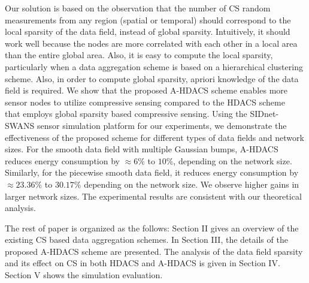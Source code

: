 \documentclass[conference]{IEEEtran}
\begin{document}
Our solution is based on the observation that the number of CS random measurements 
from any region (spatial or temporal) should correspond to the 
local sparsity of the data field, instead of global sparsity. 
Intuitively, it should work well because the nodes are 
more correlated with each other in a local area than the entire global area.  
Also,  it is easy to compute the local sparsity, particularly when a data aggregation scheme is 
based on a hierarchical clustering scheme.  Also, in order to compute global sparsity, 
apriori knowledge of the data field is required.  
We show that the proposed A-HDACS scheme 
enables more sensor nodes to utilize compressive sensing compared to the HDACS 
scheme~\cite{HDACS}
that employs global sparsity based compressive sensing. Using the SIDnet-SWANS \cite{SIDnet} 
sensor simulation platform for our experiments, we demonstrate 
the effectiveness of the proposed scheme 
for different types of data fields and network sizes. 
For the smooth data field with multiple Gaussian bumps, A-HDACS 
reduces energy consumption by $\approx 6\% $ to $10\%$, depending on the network size. Similarly, 
for the piecewise smooth data 
field, it reduces energy consumption by $\approx 23.36\% $ to $30.17\%$ depending on the network size.
We observe higher gains in larger network sizes. 
The experimental results are consistent with our theoretical analysis. 

The rest of paper is organized as the follows: Section II gives an overview of the existing 
CS based data aggregation schemes. In Section III, the details of the proposed A-HDACS scheme 
are presented. The analysis of the data field sparsity and its effect on CS in both HDACS and 
A-HDACS is given in Section IV. Section V shows the simulation evaluation. 
\end{document}
